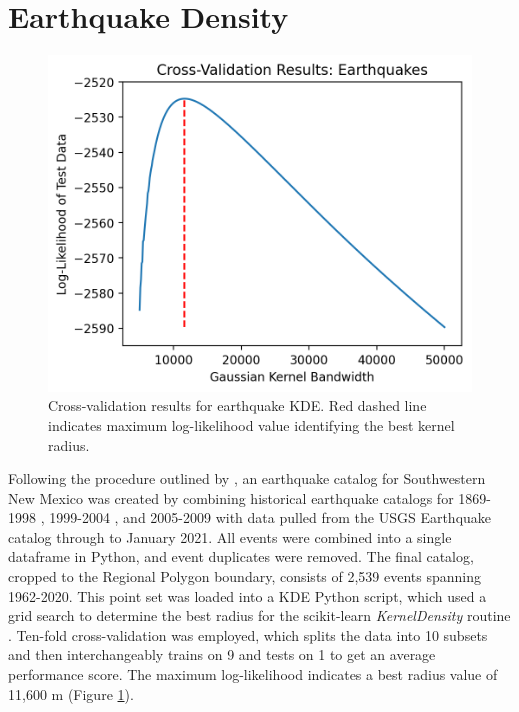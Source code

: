 \section{Earthquake Density}\label{app:dl_eq_density}

\begin{figure}
\includegraphics[scale=0.6]{templates/images/Figure-Earthquakes_kde_gridsearchcv_result.png}
\singlespacing
\caption[Earthquake density parameter tuning]{Cross-validation results for earthquake KDE. Red dashed line indicates maximum log-likelihood value identifying the best kernel radius.}
\label{fig:EQ_cv}
\end{figure}
Following the procedure outlined by \citet{pepin_new_2019}, an earthquake catalog for Southwestern New Mexico was created by combining historical earthquake catalogs for 1869-1998 \citep{sanford_earthquake_2002}, 1999-2004 \citep{sanford_earthquake_2006}, and 2005-2009 \citep{pursley_earthquake_2013} with data pulled from the USGS Earthquake catalog \citep{usgs_earthquake_2021} through to January 2021. All events were combined into a single dataframe in Python, and event duplicates were removed. The final catalog, cropped to the Regional Polygon boundary, consists of 2,539 events spanning 1962-2020. This point set was loaded into a KDE Python script, which used a grid search to determine the best radius for the scikit-learn \textit{KernelDensity} routine \citep{pedregosa_scikit-learn_2011}. Ten-fold cross-validation was employed, which splits the data into 10 subsets and then interchangeably trains on 9 and tests on 1 to get an average performance score. The maximum log-likelihood indicates a best radius value of 11,600 m (Figure \ref{fig:EQ_cv}). 


